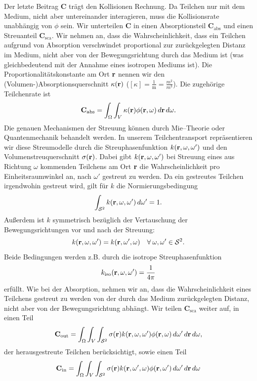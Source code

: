 	Der letzte Beitrag $\mathbf{C}$ trägt den Kollisionen Rechnung. Da Teilchen nur mit dem Medium, nicht aber untereinander interagieren, muss die Kollisionsrate unabhängig von $\phi$ sein. Wir unterteilen $\mathbf{C}$ in einen Absorptionsteil $\mathbf{C}_\text{abs}$ und einen Streuanteil $\mathbf{C}_\text{sca}$. Wir nehmen an, dass die Wahrscheinlichkeit, dass ein Teilchen aufgrund von Absorption verschwindet proportional zur zurückgelegten Distanz im Medium, nicht aber von der Bewegungsrichtung durch das Medium ist (was gleichbedeutend mit der Annahme eines isotropen Mediums ist). Die Proportionalitätskonstante am Ort $\mathbf{r}$ nennen wir den (Volumen-)Absorptionsquerschnitt $\kappa(\mathbf{r})$ ($[\kappa]=\frac{1}{\text{m}}=\frac{m^2}{m^3}$). Die zugehörige Teilchenrate ist
	$$\mathbf{C}_\text{abs}=\int_\Omega \int_V \kappa(\mathbf{r})\phi(\mathbf{r},\omega)\,d\mathbf{r}\,d\omega.$$
	Die genauen Mechanismen der Streuung können durch Mie--Theorie oder Quantenmechanik behandelt werden. In unserem Teilchentransport repräsentieren wir diese Streumodelle durch die Streuphasenfunktion $k(\mathbf{r},\omega,\omega')$ und den Volumenstreuquerschnitt $\sigma(\mathbf{r})$. Dabei gibt $k(\mathbf{r},\omega,\omega')$ bei Streuung eines aus Richtung $\omega$ kommenden Teilchens am Ort $\mathbf{r}$ die Wahrscheinlichkeit pro Einheitsraumwinkel an, nach $\omega'$ gestreut zu werden. Da ein gestreutes Teilchen irgendwohin gestreut wird, gilt für $k$ die Normierungsbedingung
	\begin{equation}\label{eq:k_norm_req}
	  \int_{\mathcal{S}^2} k(\mathbf{r},\omega,\omega')\,d\omega'=1.
	\end{equation}
	Außerdem ist $k$ symmetrisch bezüglich der Vertauschung der Bewegungsrichtungen vor und nach der Streuung:
	$$k(\mathbf{r},\omega,\omega')=k(\mathbf{r},\omega',\omega)\quad \forall\:\omega,\omega'\in\mathcal{S}^2.$$
	Beide Bedingungen werden z.B. durch die isotrope Streuphasenfunktion $$k_\text{iso}(\mathbf{r},\omega,\omega')=\frac{1}{4\pi}$$ erfüllt.
	Wie bei der Absorption, nehmen wir an, dass die Wahrscheinlichkeit eines Teilchens gestreut zu werden von der durch das Medium zurückgelegten Distanz, nicht aber von der Bewegungsrichtung abhängt. Wir teilen $\mathbf{C}_\text{sca}$ weiter auf, in einen Teil
	$$\mathbf{C}_\text{out}=\int_\Omega \int_V \int_{\mathcal{S}^2} \sigma{(\mathbf{r})}k(\mathbf{r},\omega,\omega')\phi(\mathbf{r},\omega)\,d\omega'\,d\mathbf{r}\,d\omega,$$
	der herausgestreute Teilchen berücksichtigt, sowie einen Teil
	$$\mathbf{C}_\text{in}=\int_\Omega \int_V \int_{\mathcal{S}^2} \sigma{(\mathbf{r})}k(\mathbf{r},\omega',\omega)\phi(\mathbf{r},\omega')\,d\omega'\,d\mathbf{r}\,d\omega$$
